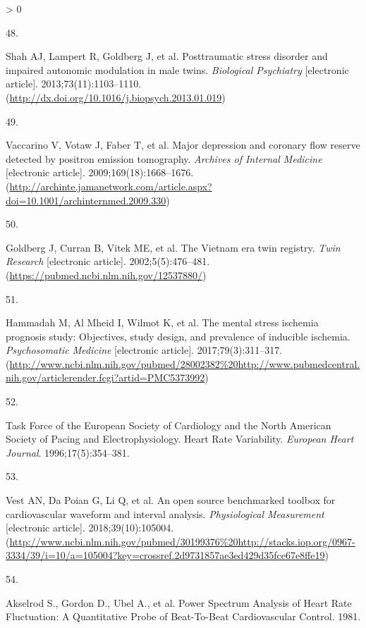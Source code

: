 \documentclass[
  11pt,
  openany]{book}
\newlength{\cslhangindent}
\newlength{\csllabelwidth}
\newenvironment{CSLReferences}[2] %
 {%
  \setlength{\parindent}{0pt}
  \ifodd #1 \everypar{\setlength{\hangindent}{\cslhangindent}}\ignorespaces\fi
  \ifnum #2 > 0
  \setlength{\parskip}{#2\baselineskip}
  \fi
 }%
 {}
\newcommand{\CSLLeftMargin}[1]{\parbox[t]{\csllabelwidth}{#1}}
\newcommand{\CSLRightInline}[1]{\parbox[t]{\linewidth - \csllabelwidth}{#1}\break}
\begin{document}
\begin{CSLReferences}{0}{0}
\leavevmode\hypertarget{ref-Shah2013}{}%
\CSLLeftMargin{48. }
\CSLRightInline{Shah AJ, Lampert R, Goldberg J, et al. {Posttraumatic stress disorder and impaired autonomic modulation in male twins}. \emph{Biological Psychiatry} {[}electronic article{]}. 2013;73(11):1103--1110. (\url{http://dx.doi.org/10.1016/j.biopsych.2013.01.019})}

\leavevmode\hypertarget{ref-Vaccarino2009a}{}%
\CSLLeftMargin{49. }
\CSLRightInline{Vaccarino V, Votaw J, Faber T, et al. {Major depression and coronary flow reserve detected by positron emission tomography}. \emph{Archives of Internal Medicine} {[}electronic article{]}. 2009;169(18):1668--1676. (\url{http://archinte.jamanetwork.com/article.aspx?doi=10.1001/archinternmed.2009.330})}

\leavevmode\hypertarget{ref-Goldberg2002}{}%
\CSLLeftMargin{50. }
\CSLRightInline{Goldberg J, Curran B, Vitek ME, et al. {The Vietnam era twin registry}. \emph{Twin Research} {[}electronic article{]}. 2002;5(5):476--481. (\url{https://pubmed.ncbi.nlm.nih.gov/12537880/})}

\leavevmode\hypertarget{ref-Hammadah2017a}{}%
\CSLLeftMargin{51. }
\CSLRightInline{Hammadah M, Al Mheid I, Wilmot K, et al. {The mental stress ischemia prognosis study: Objectives, study design, and prevalence of inducible ischemia}. \emph{Psychosomatic Medicine} {[}electronic article{]}. 2017;79(3):311--317. (\url{http://www.ncbi.nlm.nih.gov/pubmed/28002382\%20http://www.pubmedcentral.nih.gov/articlerender.fcgi?artid=PMC5373992})}

\leavevmode\hypertarget{ref-TaskForceoftheESCandNAS1996a}{}%
\CSLLeftMargin{52. }
\CSLRightInline{Task Force of the European Society of Cardiology and the North American Society of Pacing and Electrophysiology. {Heart Rate Variability}. \emph{European Heart Journal}. 1996;17(5):354--381. }

\leavevmode\hypertarget{ref-Vest2018}{}%
\CSLLeftMargin{53. }
\CSLRightInline{Vest AN, Da Poian G, Li Q, et al. {An open source benchmarked toolbox for cardiovascular waveform and interval analysis}. \emph{Physiological Measurement} {[}electronic article{]}. 2018;39(10):105004. (\url{http://www.ncbi.nlm.nih.gov/pubmed/30199376\%20http://stacks.iop.org/0967-3334/39/i=10/a=105004?key=crossref.2d9731857ae3ed429d35fce67e8ffe19})}

\leavevmode\hypertarget{ref-Akselrod1981}{}%
\CSLLeftMargin{54. }
\CSLRightInline{Akselrod S., Gordon D., Ubel A., et al. {Power Spectrum Analysis of Heart Rate Fluctuation: A Quantitative Probe of Beat-To-Beat Cardiovascular Control}. 1981.}


\end{CSLReferences}
\end{document}
